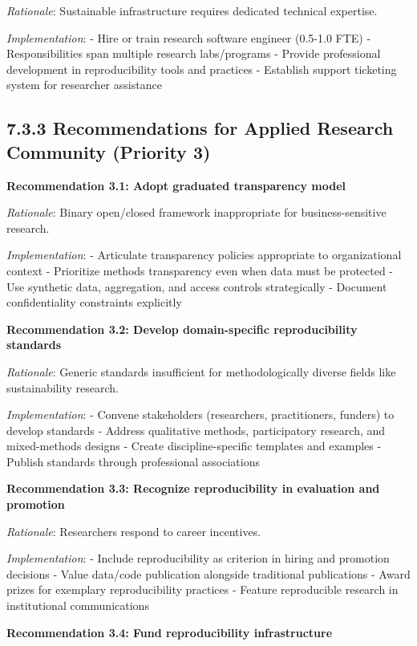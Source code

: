 \documentclass[
  oneside,
  open=any]{scrbook}
\begin{document}
\emph{Rationale}: Sustainable infrastructure requires dedicated
technical expertise.

\emph{Implementation}: - Hire or train research software engineer
(0.5-1.0 FTE) - Responsibilities span multiple research labs/programs -
Provide professional development in reproducibility tools and practices
- Establish support ticketing system for researcher assistance

\subsection{7.3.3 Recommendations for Applied Research Community
(Priority
3)}\label{recommendations-for-applied-research-community-priority-3}

\textbf{Recommendation 3.1: Adopt graduated transparency model}

\emph{Rationale}: Binary open/closed framework inappropriate for
business-sensitive research.

\emph{Implementation}: - Articulate transparency policies appropriate to
organizational context - Prioritize methods transparency even when data
must be protected - Use synthetic data, aggregation, and access controls
strategically - Document confidentiality constraints explicitly

\textbf{Recommendation 3.2: Develop domain-specific reproducibility
standards}

\emph{Rationale}: Generic standards insufficient for methodologically
diverse fields like sustainability research.

\emph{Implementation}: - Convene stakeholders (researchers,
practitioners, funders) to develop standards - Address qualitative
methods, participatory research, and mixed-methods designs - Create
discipline-specific templates and examples - Publish standards through
professional associations

\textbf{Recommendation 3.3: Recognize reproducibility in evaluation and
promotion}

\emph{Rationale}: Researchers respond to career incentives.

\emph{Implementation}: - Include reproducibility as criterion in hiring
and promotion decisions - Value data/code publication alongside
traditional publications - Award prizes for exemplary reproducibility
practices - Feature reproducible research in institutional
communications

\textbf{Recommendation 3.4: Fund reproducibility infrastructure}
\end{document}
